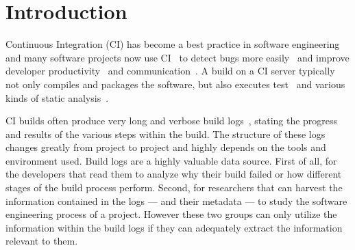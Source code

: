 \documentclass[\myrootdir/main.tex]{subfiles}
\begin{document}
\chapter{Introduction}



Continuous Integration (CI) has become a best practice in software engineering and many software projects now use CI~\cite{hilton2016usage,staahl2014modeling,beller2017oops} to detect bugs more easily~\cite{vasilescu2015quality,duvall2007continuous} and improve developer productivity~\cite{miller2008hundred,hilton2016usage} and communication~\cite{downs2012ambient}. A build on a CI server typically not only compiles and packages the software, but also executes test~\cite{beller2017oops} and various kinds of static analysis~\cite{zampetti2017open}.

CI builds often produce very long and verbose build logs~\cite{beller2017oops}, stating the progress and results of the various steps within the build. The structure of these logs changes greatly from project to project and highly depends on the tools and environment used.
Build logs are a highly valuable data source. First of all, for the developers that read them to analyze why their build failed or how different stages of the build process perform.
Second, for researchers that can harvest the information contained in the logs --- and their metadata --- to study the software engineering process of a project.
However these two groups can only utilize the information within the build logs if they can adequately extract the information relevant to them.
\end{document}
